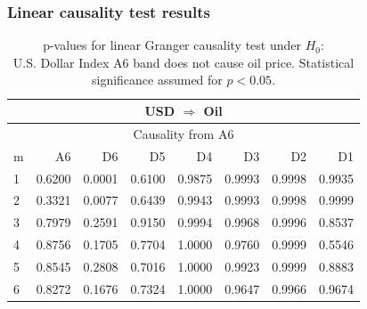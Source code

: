 \subsubsection{Linear causality test results}

%
%
\begin{table}[H]
\begin{center}
\begin{tabular}{l|r r r r r r r}
\hline\hline
\multicolumn{8}{c}{USD $\Rightarrow$ Oil}\\
\hline
\multicolumn{8}{c}{Causality from A6}\\
\hline\hline
m & A6 & D6 & D5 & D4 & D3 & D2 & D1 \\
\hline
1 & 0.6200 & \cellcolor{mygreen}0.0001 & 0.6100 & 0.9875 & 0.9993 & 0.9998 & 0.9935 \\
2 & 0.3321 & \cellcolor{mygreen}0.0077 & 0.6439 & 0.9943 & 0.9993 & 0.9998 & 0.9999 \\
3 & 0.7979 & 0.2591 & 0.9150 & 0.9994 & 0.9968 & 0.9996 & 0.8537 \\
4 & 0.8756 & 0.1705 & 0.7704 & 1.0000 & 0.9760 & 0.9999 & 0.5546 \\
5 & 0.8545 & 0.2808 & 0.7016 & 1.0000 & 0.9923 & 0.9999 & 0.8883 \\
6 & 0.8272 & 0.1676 & 0.7324 & 1.0000 & 0.9647 & 0.9966 & 0.9674 \\
\hline\hline
\end{tabular}
\caption{p-values for linear Granger causality test under $H_0$:\\
U.S. Dollar Index A6 band does not cause oil price. Statistical significance assumed for $p<0.05$.} 
\end{center}
\end{table}

